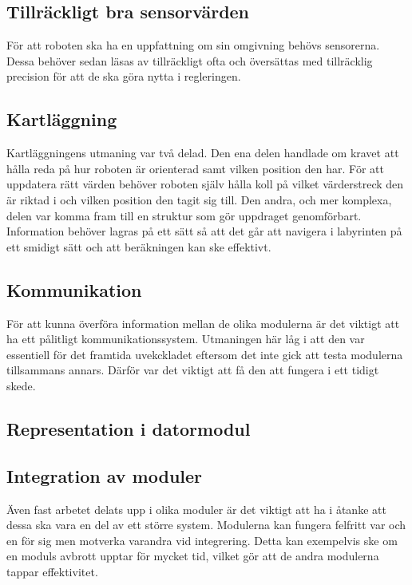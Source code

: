 \documentclass[11pt]{article}
\begin{document}
\begin{flushleft}
\subsection{Tillräckligt bra sensorvärden}
För att roboten ska ha en uppfattning om sin omgivning behövs sensorerna. Dessa behöver sedan läsas av tillräckligt ofta och översättas med tillräcklig precision för att de ska göra nytta i regleringen. 

\subsection{Kartläggning}
Kartläggningens utmaning var två delad. Den ena delen handlade om kravet att hålla reda på hur roboten är orienterad samt vilken position den har. För att uppdatera rätt värden behöver roboten själv hålla koll på vilket värderstreck den är riktad i och vilken position den tagit sig till. Den andra, och mer komplexa, delen var komma fram till en struktur som gör uppdraget genomförbart. Information behöver lagras på ett sätt så att det går att navigera i labyrinten på ett smidigt sätt och att beräkningen kan ske effektivt.

\subsection{Kommunikation}
För att kunna överföra information mellan de olika modulerna är det viktigt att ha ett pålitligt kommunikationssystem. Utmaningen här låg i att den var essentiell för det framtida uvekckladet eftersom det inte gick att testa modulerna tillsammans annars. Därför var det viktigt att få den att fungera i ett tidigt skede.

\subsection{Representation i datormodul}

\subsection{Integration av moduler}
Även fast arbetet delats upp i olika moduler är det viktigt att ha i åtanke att dessa ska vara en del av ett större system. Modulerna kan fungera felfritt var och en för sig men motverka varandra vid integrering. Detta kan exempelvis ske om en moduls avbrott upptar för mycket tid, vilket gör att de andra modulerna tappar effektivitet. 

\pagebreak


\end{flushleft}
\end{document}

